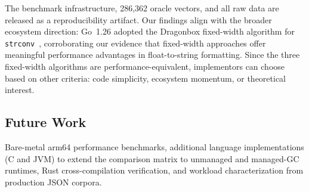 The benchmark infrastructure, 286{,}362 oracle vectors, and all raw data
are released as a reproducibility artifact.  Our findings align with the
broader ecosystem direction: Go~1.26 adopted the Dragonbox fixed-width
algorithm for \texttt{strconv}~\cite{godragonboxcl}, corroborating our evidence that
fixed-width approaches offer meaningful performance advantages in
float-to-string formatting.  Since the three fixed-width algorithms are
performance-equivalent, implementors can choose based on other criteria:
code simplicity, ecosystem momentum, or theoretical interest.

\subsection*{Future Work}

Bare-metal arm64 performance benchmarks, additional language
implementations (C and JVM) to extend the comparison matrix to unmanaged
and managed-GC runtimes, Rust cross-compilation verification, and
workload characterization from production JSON corpora.
